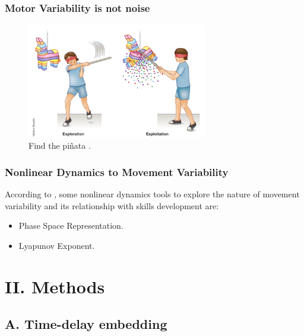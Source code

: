 \documentclass{beamer}
\begin{document}
\begin{frame}
  \frametitle{Motor Variability is not noise}


  \begin{figure}
 \includegraphics[width=0.7\textwidth]{herzfelt2014_fig1}
\centering
\caption{Find the pi\~nata \textcolor{red}{\textbf{  \cite{Herzfeld2014}   }}.}
 \end{figure}



\end{frame}





\begin{frame}
\frametitle{Nonlinear Dynamics to  Movement Variability}


According to \textcolor{red}{\textbf{  \cite{Preatoni2013}   }},
some nonlinear dynamics tools to explore the nature of movement variability
and its relationship with skills development are:
\begin{itemize}
    \item Phase Space Representation.
    \item Lyapunov Exponent.
\end{itemize}


\end{frame}




\section{II. Methods}







\subsection{A. Time-delay embedding}
\end{document}
